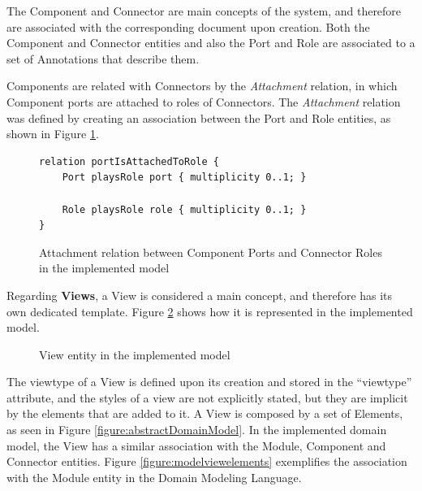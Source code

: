 \documentclass{llncs}
\begin{document}
The Component and Connector are main concepts of the system, and therefore are associated with the corresponding document upon creation. Both the Component and Connector entities and also the Port and Role are associated to a set of Annotations that describe them.

Components are related with Connectors by the \textit{Attachment} relation, in which Component ports are attached to roles of Connectors. The \textit{Attachment} relation was defined by creating an association between the Port and Role entities, as shown in Figure \ref{figure:modelAttachmentRelation}.

\begin{figure}
\lstset{style=customjava}
\begin{lstlisting}
relation portIsAttachedToRole {
	Port playsRole port { multiplicity 0..1; }
	
	Role playsRole role { multiplicity 0..1; }
}
\end{lstlisting}
\caption{Attachment relation between Component Ports and Connector Roles in the implemented model}
\label{figure:modelAttachmentRelation}
\end{figure}

Regarding \textbf{Views}, a View is considered a main concept, and therefore has its own dedicated template. Figure \ref{figure:modelView} shows how it is represented in the implemented model.

\begin{figure}
\centering
\renewcommand {\umltextcolor}{black}
\renewcommand {\umlfillcolor}{none}
\renewcommand {\umldrawcolor}{black}
\caption{View entity in the implemented model}
\label{figure:modelView}
\end{figure}

The viewtype of a View is defined upon its creation and stored in the ``viewtype'' attribute, and the styles of a view are not explicitly stated, but they are implicit by the elements that are added to it. A View is composed by a set of Elements, as seen in Figure \ref{figure:abstractDomainModel}. In the implemented domain model, the View has a similar association with the Module, Component and Connector entities. Figure \ref{figure:modelviewelements} exemplifies the association with the Module entity in the Domain Modeling Language.
\end{document}
